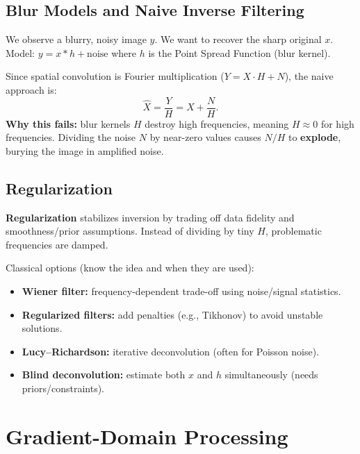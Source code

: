\documentclass[11pt, oneside]{book}
\begin{document}
\subsection{Blur Models and Naive Inverse Filtering}

\begin{defbox}[title={Image Degradation Model}]
We observe a blurry, noisy image $y$. We want to recover the sharp original $x$.
Model: $y = x*h + \text{noise}$ where $h$ is the Point Spread Function (blur kernel).
\end{defbox}

\begin{thmbox}[title={Naive Inverse Filtering}]
Since spatial convolution is Fourier multiplication ($Y = X \cdot H + N$), the naive approach is:
\[
\hat{X} = \frac{Y}{H} = X + \frac{N}{H}.
\]
\textbf{Why this fails:} blur kernels $H$ destroy high frequencies, meaning $H \approx 0$ for high frequencies.
Dividing the noise $N$ by near-zero values causes $N/H$ to \textbf{explode}, burying the image in amplified noise.
\end{thmbox}

\subsection{Regularization}

\begin{intbox}
\textbf{Regularization} stabilizes inversion by trading off data fidelity and smoothness/prior assumptions.
Instead of dividing by tiny $H$, problematic frequencies are damped.
\end{intbox}

Classical options (know the idea and when they are used):
\begin{itemize}
  \item \textbf{Wiener filter:} frequency-dependent trade-off using noise/signal statistics.
  \item \textbf{Regularized filters:} add penalties (e.g., Tikhonov) to avoid unstable solutions.
  \item \textbf{Lucy--Richardson:} iterative deconvolution (often for Poisson noise).
  \item \textbf{Blind deconvolution:} estimate both $x$ and $h$ simultaneously (needs priors/constraints).
\end{itemize}

\section{Gradient-Domain Processing}
\end{document}
